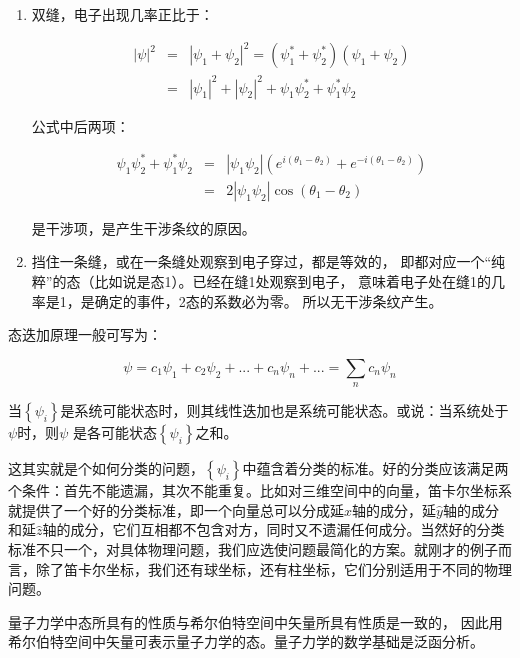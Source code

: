 \begin{enumerate}
    \item 双缝，电子出现几率正比于：
    
\begin{eqnarray*}
\left| \psi  \right|^2 &=& \left| {\psi _1  + \psi _2 } \right|^2  = \left( {\psi _1 ^*  + \psi _2 ^* } \right)\left( {\psi _1  + \psi _2 } \right) \\
{} &=& \left| {\psi _1 } \right|^2  + \left| {\psi _2 } \right|^2  + \psi _1 \psi _2 ^*   + \psi _1 ^* \psi _2
\end{eqnarray*}

公式中后两项：

\begin{eqnarray*}
\psi _1 \psi _2 ^*   + \psi _1 ^* \psi _2 &=& \left| \psi_1 \psi_2 \right| \left( e^{i (\theta_1 - \theta_2)} + e^{ - i (\theta_1 - \theta_2)} \right) \\
{} &=& 2 \left| \psi_1 \psi_2 \right| \cos (\theta_1 - \theta_2) 
\end{eqnarray*}

是干涉项，是产生干涉条纹的原因。


    \item 挡住一条缝，或在一条缝处观察到电子穿过，都是等效的，
即都对应一个``纯粹''的态（比如说是态1）。已经在缝1处观察到电子，
意味着电子处在缝1的几率是1，是确定的事件，2态的系数必为零。
所以无干涉条纹产生。
   \end{enumerate}


态迭加原理一般可写为：

\begin{equation}
\psi  = c_1 \psi _1  + c_2 \psi _2  + ... + c_n \psi _n  + ... = \sum\limits_n {c_n \psi _n } 
\end{equation}

当$\left\{ {\psi _i } \right\}$是系统可能状态时，则其线性迭加也是系统可能状态。或说：当系统处于$\psi$时，则$\psi$ 是各可能状态$\left\{ {\psi _i } \right\}$之和。

这其实就是个如何分类的问题，$\left\{ {\psi _i } \right\}$中蕴含着分类的标准。好的分类应该满足两个条件：首先不能遗漏，其次不能重复。比如对三维空间中的向量，笛卡尔坐标系就提供了一个好的分类标准，即一个向量总可以分成延$\hat x$轴的成分，延$\hat y$轴的成分和延$\hat z$轴的成分，它们互相都不包含对方，同时又不遗漏任何成分。当然好的分类标准不只一个，对具体物理问题，我们应选使问题最简化的方案。就刚才的例子而言，除了笛卡尔坐标，我们还有球坐标，还有柱坐标，它们分别适用于不同的物理问题。

量子力学中态所具有的性质与希尔伯特空间中矢量所具有性质是一致的，
因此用希尔伯特空间中矢量可表示量子力学的态。量子力学的数学基础是泛函分析。


